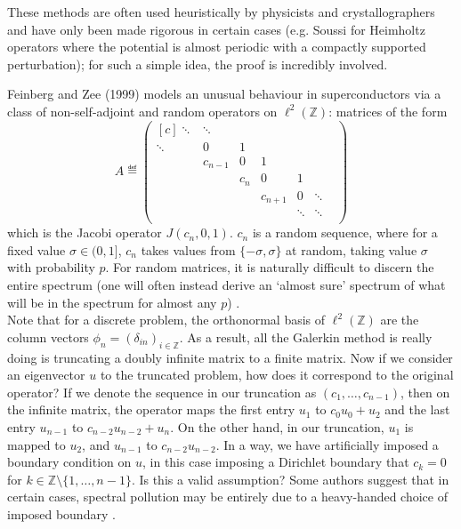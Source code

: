 \documentclass[../main.tex]{subfiles}
\begin{document}
These methods are often used heuristically by physicists and crystallographers
and have only been made rigorous in certain cases (e.g. Soussi
\cite{soussi2006convergence} for Heimholtz operators where the potential is
almost periodic with a compactly supported perturbation); for such a simple
idea, the proof is incredibly involved. 

Feinberg and Zee (1999) \cite{feinberg1999nonhermitian} models an unusual
behaviour in superconductors via a class of non-self-adjoint and random
operators on $\ell^2(\mathbb{Z})$: matrices of the form
  $$ 
  A \eqdef
  \begin{pmatrix*}[c]
    \ddots & \ddots & & & & \\
    \ddots & 0 & 1 & & & \\
    & c_{n-1} & 0 & 1 & & \\
    & & c_{n} & 0 & 1 & \\
    & & & c_{n+1} & 0 & \ddots \\
    & & & & \ddots & \ddots & \\ \end{pmatrix*}
  $$
which is the Jacobi operator $J(c_n, 0, 1)$. $c_n$ is a random sequence, where
for a fixed value $\sigma \in (0, 1]$, $c_n$ takes values from $\{-\sigma,
\sigma\}$ at random, taking value $\sigma$ with probability $p$. For random
matrices, it is naturally difficult to discern the entire spectrum (one will
often instead derive an `almost sure' spectrum of what will be in the spectrum
for almost any $p$) \cite{chandler-wilde2012spectrum}.\\

Note that for a discrete problem, the orthonormal basis of $\ell^2(\mathbb{Z})$
are the column vectors $\phi_n = (\delta_{in})_{i \in \mathbb{Z}}$. As a result,
all the Galerkin method is really doing is truncating a doubly infinite matrix
to a finite matrix. Now if we consider an eigenvector $u$ to the truncated
problem, how does it correspond to the original operator? If we denote the
sequence in our truncation as $(c_1, \hdots, c_{n-1})$, then on the infinite
matrix, the operator maps the first entry $u_1$ to $c_0 u_0 + u_2$ and the last
entry $u_{n-1}$ to $c_{n-2} u_{n-2} + u_{n}$. On the other hand, in our
truncation, $u_1$ is mapped to $u_2$, and $u_{n-1}$ to $c_{n-2} u_{n-2}$. In a
way, we have artificially imposed a boundary condition on $u$, in this case
imposing a Dirichlet boundary that $c_k = 0$ for $k \in \mathbb{Z} \setminus
\{1, \hdots, n-1\}$. Is this a valid assumption? Some authors suggest that in
certain cases, spectral pollution may be entirely due to a heavy-handed choice
of imposed boundary \cite{cances2011periodic}.
\end{document}
